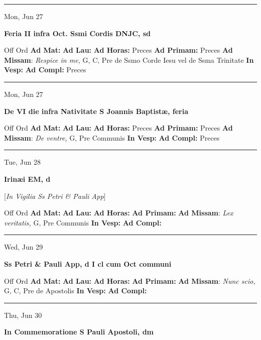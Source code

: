 \documentclass[letterpaper, 10pt]{article}
\begin{document}
\hrule
\begin{center}
Mon, Jun 27
\end{center}\textbf{ \large Feria II infra Oct. Ssmi Cordis DNJC, \textnormal{\normalsize sd}}
\begin{justify}
Off Ord
\textbf{Ad Mat: }
\textbf{Ad Lau: }
\textbf{Ad Horas: }Preces
\textbf{Ad Primam: }Preces
\textbf{Ad Missam}: \textit{Respice in me,} G, C, Pre de Ssmo Corde Iesu vel de Ssma Trinitate
\textbf{In Vesp: }
\textbf{Ad Compl: }Preces\end{justify}



\hrule
\begin{center}
Mon, Jun 27
\end{center}\textbf{ \large De VI die infra Nativitate S Joannis Baptistæ, \textnormal{\normalsize feria}}
\begin{justify}
Off Ord
\textbf{Ad Mat: }
\textbf{Ad Lau: }
\textbf{Ad Horas: }Preces
\textbf{Ad Primam: }Preces
\textbf{Ad Missam}: \textit{De ventre,} G, Pre Communis
\textbf{In Vesp: }
\textbf{Ad Compl: }Preces\end{justify}



\hrule
\begin{center}
Tue, Jun 28
\end{center}\textbf{ \large Irinæi EM, \textnormal{\normalsize d}}

[\textit{In Vigilia Ss Petri \& Pauli App}]
\begin{justify}
Off Ord
\textbf{Ad Mat: }
\textbf{Ad Lau: }
\textbf{Ad Horas: }
\textbf{Ad Primam: }
\textbf{Ad Missam}: \textit{Lex veritatis,} G, Pre Communis
\textbf{In Vesp: }
\textbf{Ad Compl: }\end{justify}



\hrule
\begin{center}
Wed, Jun 29
\end{center}\textbf{ \large Ss Petri \& Pauli App, \textnormal{\normalsize d I cl cum Oct communi}}
\begin{justify}
Off Ord
\textbf{Ad Mat: }
\textbf{Ad Lau: }
\textbf{Ad Horas: }
\textbf{Ad Primam: }
\textbf{Ad Missam}: \textit{Nunc scio,} G, C, Pre de Apostolis
\textbf{In Vesp: }
\textbf{Ad Compl: }\end{justify}



\hrule
\begin{center}
Thu, Jun 30
\end{center}\textbf{ \large In Commemoratione S Pauli Apostoli, \textnormal{\normalsize dm}}
\end{document}
